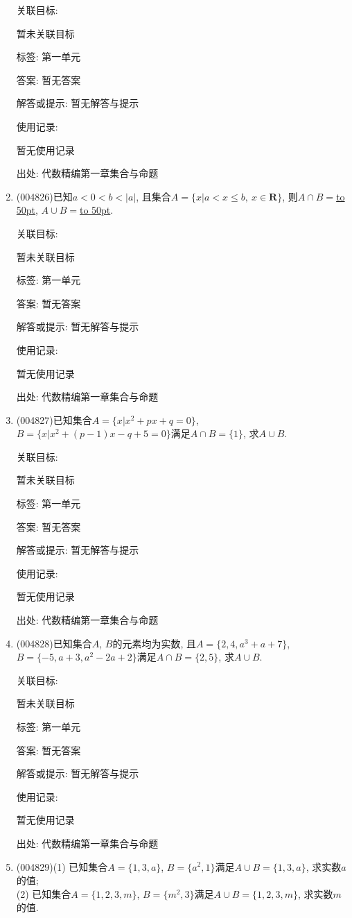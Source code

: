 \documentclass[10pt,a4paper]{article}
\newcommand{\blank}[1]{\underline{\hbox to #1pt{}}}
\begin{document}
\begin{enumerate}[1.]
关联目标:

暂未关联目标



标签: 第一单元

答案: 暂无答案

解答或提示: 暂无解答与提示

使用记录:

暂无使用记录


出处: 代数精编第一章集合与命题
\item { (004826)}已知$a<0<b<|a|$, 且集合$A=\{x|a<x\le b, \ x\in \mathbf{R}\}$, 则$A\cap B=$\blank{50}, $A\cup B=$\blank{50}.


关联目标:

暂未关联目标



标签: 第一单元

答案: 暂无答案

解答或提示: 暂无解答与提示

使用记录:

暂无使用记录


出处: 代数精编第一章集合与命题
\item { (004827)}已知集合$A=\{x|x^2+px+q=0\}$, $B=\{x|x^2+(p-1)x-q+5=0\}$满足$A\cap B=\{1\}$, 求$A\cup B$.


关联目标:

暂未关联目标



标签: 第一单元

答案: 暂无答案

解答或提示: 暂无解答与提示

使用记录:

暂无使用记录


出处: 代数精编第一章集合与命题
\item { (004828)}已知集合$A$, $B$的元素均为实数, 且$A=\{2,4,a^3+a+7\}$, $B=\{-5,a+3,a^2-2a+2\}$满足$A\cap B=\{2,5\}$, 求$A\cup B$.


关联目标:

暂未关联目标



标签: 第一单元

答案: 暂无答案

解答或提示: 暂无解答与提示

使用记录:

暂无使用记录


出处: 代数精编第一章集合与命题
\item { (004829)}(1) 已知集合$A=\{1,3,a\}$, $B=\{a^2,1\}$满足$A\cup B=\{1,3,a\}$, 求实数$a$的值;\\
(2) 已知集合$A=\{1,2,3,m\}$, $B=\{m^2,3\}$满足$A\cup B=\{1,2,3,m\}$, 求实数$m$的值.



\end{enumerate}
\end{document}
